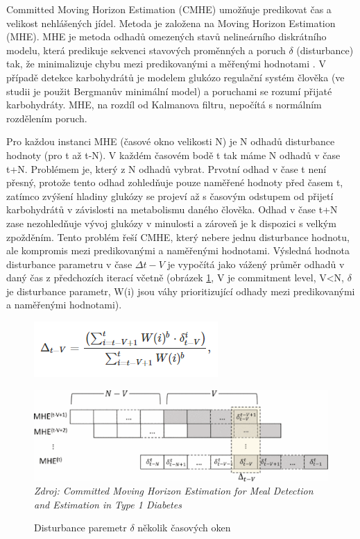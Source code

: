 Committed Moving Horizon Estimation (CMHE) \citep{Analyza.MovingHorizon} umožňuje predikovat čas a velikost nehlášených jídel. Metoda je založena na Moving Horizon Estimation (MHE). MHE je metoda odhadů omezených stavů nelineárního diskrátního modelu, která predikuje sekvenci stavových proměnných a poruch $\delta$ (disturbance) tak, že minimalizuje chybu mezi predikovanými a měřenými hodnotami \citep{Analyza.MovingHorizon}. V případě detekce karbohydrátů je modelem glukózo regulační systém člověka (ve studii je použit Bergmanův minimální model) a poruchami se rozumí přijaté karbohydráty. MHE, na rozdíl od Kalmanova filtru, nepočítá s normálním rozdělením poruch. 

Pro každou instanci MHE (časové okno velikosti N) je N odhadů disturbance hodnoty (pro t až t-N). V každém časovém bodě t tak máme N odhadů v čase t+N. Problémem je, který z N odhadů vybrat. Prvotní odhad v čase t není přesný, protože tento odhad zohledňuje pouze naměřené hodnoty před časem t, zatímco zvýšení hladiny glukózy se projeví až s časovým odstupem od přijetí karbohydrátů v závislosti na metabolismu daného člověka. Odhad v čase t+N zase nezohledňuje vývoj glukózy v minulosti a zároveň je k dispozici s velkým zpožděním. Tento problém řeší CMHE, který nebere jednu disturbance hodnotu, ale kompromis mezi predikovanými a naměřenými hodnotami. Výsledná hodnota disturbance parametru v čase $\Delta t-V$ je vypočítá jako vážený průměr odhadů v daný čas z předchozích iterací včetně (obrázek \ref{fig:horizon1}, V je commitment level, V<N, $\delta$ je disturbance parametr, W(i) jsou váhy prioritizující odhady mezi predikovanými a naměřenými hodnotami).

\begin{figure}[H]
\includegraphics{img/analyza/horizon2.png}
\end{figure}

\begin{figure}[H]
\caption{Disturbance paremetr $\delta$ několik časových oken}
\label{fig:horizon1}
\centering
\includegraphics[width=1\textwidth]{img/analyza/horizon1.png}\\
\textit{Zdroj: Committed Moving Horizon Estimation for Meal Detection and Estimation in Type 1 Diabetes \citep{Analyza.MovingHorizon}}
\end{figure}

